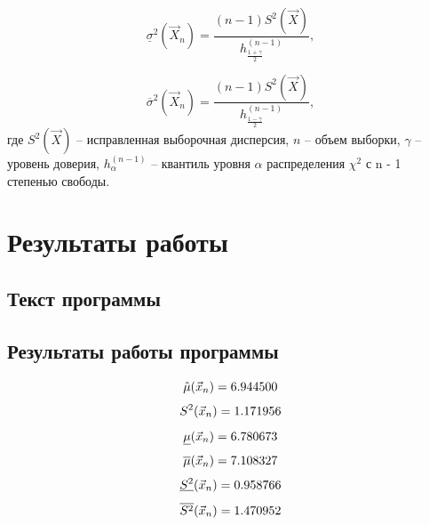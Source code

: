 $$
\underline\sigma^2(\vec X_n)= \frac{(n-1)S^2(\vec X)}{h^{(n-1)}_{\frac{1+\gamma}{2}}},
$$

$$
\overline\sigma^2(\vec X_n)= \frac{(n-1)S^2(\vec X)}{h^{(n-1)}_{\frac{1-\gamma}{2}}},
$$
где $S^2(\vec X)$ -- исправленная выборочная дисперсия, $n$ -- объем выборки, $\gamma$ -- уровень доверия, $h^{(n-1)}_{\alpha}$ -- квантиль уровня $\alpha$ распределения $\chi^2$ с n - 1 степенью свободы.


\chapter{Результаты работы}

\section{Текст программы}




\section{Результаты работы программы}


\begin{equation*}
	\hat\mu(\vec x_n) = 6.944500\\
\end{equation*}
\begin{equation*}
	S^2(\vec x_n) = 1.171956\\
\end{equation*}
\begin{equation*}
	\underline\mu(\vec x_n) = 6.780673\\
\end{equation*}
\begin{equation*}
	\overline\mu(\vec x_n) = 7.108327 \\
\end{equation*}
\begin{equation*}
	\underline{S^2}(\vec x_n) = 0.958766\\
\end{equation*}
\begin{equation*}
	\overline{S^2}(\vec x_n) = 1.470952\\
\end{equation*}



\newpage

